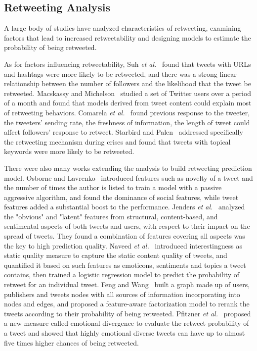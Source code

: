 \documentclass{acm_proc_article-sp}
\begin{document}
\subsection{Retweeting Analysis}
A large body of studies have analyzed characteristics of retweeting, examining factors that lead to increased retweetability and designing models to estimate the probability of being retweeted. 

As for factors influencing retweetability, Suh \emph{et al.}~\cite{Suh2010} found that tweets with URLs and hashtags were more likely to be retweeted, and there was a strong linear relationship between the number of followers and the likelihood that the tweet be retweeted. 
Macskassy and Michelson~\cite{conf/icwsm/MacskassyM11} studied a set of Twitter users over a period of a month and found that models derived from tweet content could explain most of retweeting behaviors.
Comarela \emph{et al.}~\cite{Comarela:2012UFA} found previous response to the tweeter, the tweeters’ sending rate, the freshness of information, the length of tweet could affect followers’ response to retweet. 
Starbird and Palen~\cite{Starbird:2012RRI} addressed specifically the retweeting mechanism during crises and found that tweets with topical keywords were more likely to be retweeted. 

There were also many works extending the analysis to build retweeting prediction model. 
Osborne and Lavrenko~\cite{Osborne_Lavrenko_2011} introduced features such as novelty of a tweet and the number of times the author is listed to train a model with a passive aggressive algorithm, and found the dominance of social features, while tweet features added a substantial boost to the performance.
Jenders \emph{et al.}~\cite{Jenders:2013APV} analyzed the "obvious" and "latent" features from structural, content-based, and sentimental aspects of both tweets and users, with respect to their impact on the spread of tweets. 
They found a combination of features covering all aspects was the key to high prediction quality.
Naveed \emph{et al.}~\cite{Naveed:2011SMC,2011:NaveedGKC} introduced interestingness as static quality measure to capture the static content quality of tweets, and quantified it based on such features as emoticons, sentiments and topics a tweet contains, then trained a logistic regression model to predict the probability of retweet for an individual tweet.
Feng and Wang~\cite{conf/wsdm/FengW13} built a graph made up of users, publishers and tweets nodes with all sources of information incorporating into nodes and edges, and proposed a feature-aware factorization model to rerank the tweets according to their probability of being retweeted.
Pfitzner \emph{et al.}~\cite{conf/icwsm/PfitznerGS12} proposed a new measure called emotional divergence to evaluate the retweet probability of a tweet and showed that highly emotional diverse tweets can have up to almost five times higher chances of being retweeted.
\end{document}
